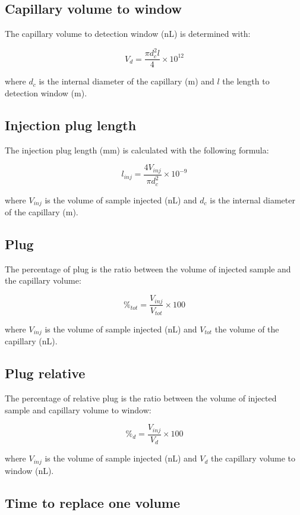 \documentclass{article}
\begin{document}
\subsection{Capillary volume to window}

The capillary volume to detection window (\si{\nano\liter}) is determined with:

\[ V_{d} = \frac{{\pi}d_c^2l}{4} \times 10^{12} \]

where \(d_c\) is the internal diameter of the capillary (\si{\meter}) and \(l\) the length to detection window (\si{\meter}).


\subsection{Injection plug length}

The injection plug length (\si{\milli\meter}) is calculated with the following formula:

\[ l_{inj} = \frac{4V_{inj}}{{\pi}d_c^2} \times 10^{-9} \]

where \(V_{inj}\) is the volume of sample injected (\si{\nano\liter}) and \(d_c\) is the internal diameter of the capillary (\si{\meter}).


\subsection{Plug}

The percentage of plug is the ratio between the volume of injected sample and the capillary volume:

\[ \%_{tot} = \frac{V_{inj}}{V_{tot}} \times 100 \]

where \(V_{inj}\) is the volume of sample injected (\si{\nano\liter}) and \(V_{tot}\) the volume of the capillary (\si{\nano\liter}).


\subsection{Plug relative}

The percentage of relative plug is the ratio between the volume of injected sample and capillary volume to window:

\[ \%_{d} = \frac{V_{inj}}{V_d} \times 100 \]

where \(V_{inj}\) is the volume of sample injected (\si{\nano\liter}) and \(V_d\) the capillary volume to window (\si{\nano\liter}).


\subsection{Time to replace one volume}
\end{document}
